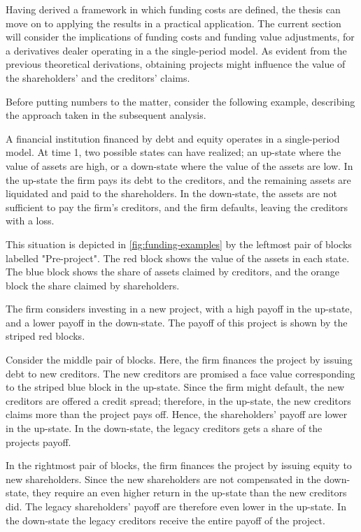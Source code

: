 \documentclass[main.tex]{subfiles}
\begin{document}
    Having derived a framework in which funding costs are defined, 
    the thesis can move on to applying the results in a practical application.
    The current section will consider the implications of funding costs and funding value adjustments,
    for a derivatives dealer operating in a the single-period model.
    As evident from the previous theoretical derivations, 
    obtaining projects might influence the value of the shareholders' and the creditors' claims.

    Before putting numbers to the matter, consider the following example,
    describing the approach taken in the subsequent analysis.

    \begin{example}
    
    A financial institution financed by debt and equity operates in a single-period model.
    At time 1, two possible states can have realized;
    an up-state where the value of assets are high,
    or a down-state where the value of the assets are low.
    In the up-state the firm pays its debt to the creditors,
    and the remaining assets are liquidated and paid to the shareholders.
    In the down-state, the assets are not sufficient to pay the firm's creditors, 
    and the firm defaults, leaving the creditors with a loss. 

    This situation is depicted in \cref{fig:funding-examples} 
    by the leftmost pair of blocks labelled "Pre-project". 
    The \textcolor{wtf-red}{red block} shows the value of the assets in each state.
    The \textcolor{wtf-blue}{blue block} shows the share of assets claimed by creditors,
    and the \textcolor{wtf-orange}{orange block} the share claimed by shareholders.

    The firm considers investing in a new project, with a high payoff in the up-state,
    and a lower payoff in the down-state.
    The payoff of this project is shown by the striped red blocks.

    Consider the middle pair of blocks.
    Here, the firm finances the project by issuing debt to new creditors.
    The new creditors are promised a face value 
    corresponding to the striped blue block in the up-state.
    Since the firm might default, the new creditors are offered a credit spread;
    therefore, in the up-state, the new creditors claims more than the project pays off.
    Hence, the shareholders' payoff are lower in the up-state. 
    In the down-state, the legacy creditors gets a share of the projects payoff.

    In the rightmost pair of blocks,
    the firm finances the project by issuing equity to new shareholders.
    Since the new shareholders are not compensated in the down-state,
    they require an even higher return in the up-state than the new creditors did.
    The legacy shareholders' payoff are therefore even lower in the up-state.
    In the down-state the legacy creditors receive the entire payoff of the project.

    \end{example}
\end{document}

